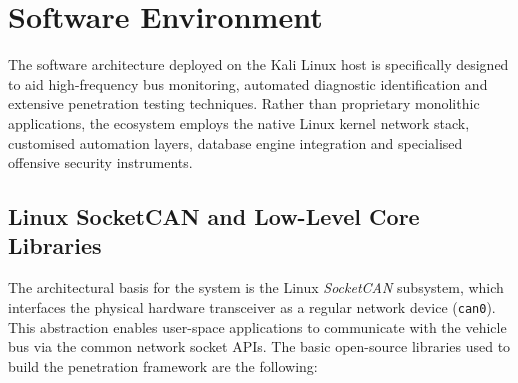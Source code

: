 \section{Software Environment}
\label{sec:sw_environment}

The software architecture deployed on the Kali Linux host is specifically designed to aid high-frequency bus monitoring, automated diagnostic identification and extensive penetration testing techniques. Rather than proprietary monolithic applications, the ecosystem employs the native Linux kernel network stack, customised automation layers, database engine integration and specialised offensive security instruments.

\subsection{Linux SocketCAN and Low-Level Core Libraries}
The architectural basis for the system is the Linux \textit{SocketCAN} subsystem, which interfaces the physical hardware transceiver as a regular network device (\texttt{can0}). This abstraction enables user-space applications to communicate with the vehicle bus via the common network socket \glspl{API}. The basic open-source libraries used to build the penetration framework are the following:
